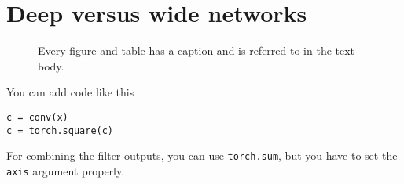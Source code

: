 \section{Deep versus wide networks}
\begin{figure}
  \begin{center}
  \end{center}
  \caption{Every figure and table has a caption and is referred to 
    in the text body.\label{fig:q6p1}}
\end{figure}

You can add code like this
\begin{lstlisting}
c = conv(x)
c = torch.square(c)
\end{lstlisting}

For combining the filter outputs, you can  use 
\lstinline{torch.sum}, but you have to set the \lstinline{axis}
argument properly.